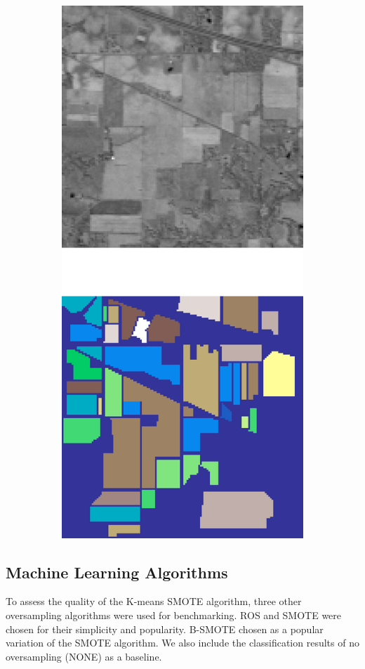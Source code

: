 \documentclass[preprint,12pt]{elsarticle}
\begin{document}
\begin{figure}[H]
\begin{subfigure}{.24\textwidth}
		\includegraphics[height=1.5\linewidth]{../analysis/indian_pines}
		\subcaption{{\medbreak}}\label{fig:indian_pines}
	\end{subfigure}
\end{figure}

\subsection{Machine Learning Algorithms}

To assess the quality of the K-means SMOTE algorithm,
three other oversampling algorithms were used for benchmarking. ROS and SMOTE
were chosen for their simplicity and popularity. B-SMOTE chosen as a popular
variation of the SMOTE algorithm. We also include the classification results
of no oversampling (NONE) as a baseline.
\end{document}
